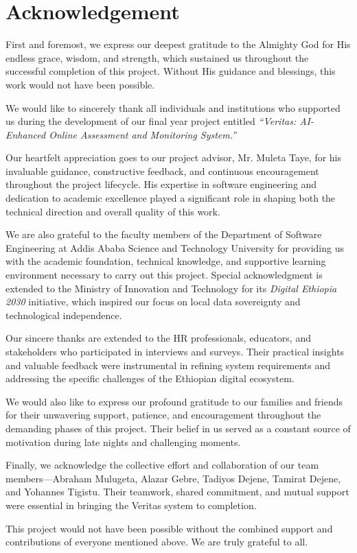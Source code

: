 \section*{Acknowledgement}
{}

First and foremost, we express our deepest gratitude to the Almighty God for His endless grace, wisdom, and strength, which sustained us throughout the successful completion of this project. Without His guidance and blessings, this work would not have been possible.

We would like to sincerely thank all individuals and institutions who supported us during the development of our final year project entitled \textit{``Veritas: AI-Enhanced Online Assessment and Monitoring System.''}

Our heartfelt appreciation goes to our project advisor, Mr. Muleta Taye, for his invaluable guidance, constructive feedback, and continuous encouragement throughout the project lifecycle. His expertise in software engineering and dedication to academic excellence played a significant role in shaping both the technical direction and overall quality of this work.

We are also grateful to the faculty members of the Department of Software Engineering at Addis Ababa Science and Technology University for providing us with the academic foundation, technical knowledge, and supportive learning environment necessary to carry out this project. Special acknowledgment is extended to the Ministry of Innovation and Technology for its \textit{Digital Ethiopia 2030} initiative, which inspired our focus on local data sovereignty and technological independence.

Our sincere thanks are extended to the HR professionals, educators, and stakeholders who participated in interviews and surveys. Their practical insights and valuable feedback were instrumental in refining system requirements and addressing the specific challenges of the Ethiopian digital ecosystem.

We would also like to express our profound gratitude to our families and friends for their unwavering support, patience, and encouragement throughout the demanding phases of this project. Their belief in us served as a constant source of motivation during late nights and challenging moments.

Finally, we acknowledge the collective effort and collaboration of our team members—Abraham Mulugeta, Alazar Gebre, Tadiyos Dejene, Tamirat Dejene, and Yohannes Tigistu. Their teamwork, shared commitment, and mutual support were essential in bringing the Veritas system to completion.

This project would not have been possible without the combined support and contributions of everyone mentioned above. We are truly grateful to all.
